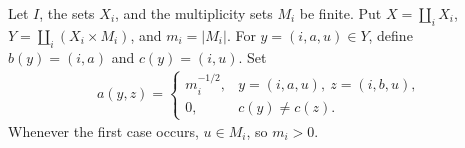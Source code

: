\begin{definition}%
    \label{def:peps_parent_support_copy_amplitude}
    \leanok
    Let $I$, the sets $X_i$, and the multiplicity sets $M_i$ be finite.
    Put $X=\coprod_iX_i$, $Y=\coprod_i(X_i\times M_i)$, and
    $m_i=|M_i|$. For $y=(i,a,u)\in Y$, define
    $b(y)=(i,a)$ and $c(y)=(i,u)$. Set
    \begin{align}
        a(y,z)=
        \begin{cases}
            m_i^{-1/2}, & y=(i,a,u),\ z=(i,b,u), \\
            0,          & c(y)\ne c(z).
        \end{cases}
        \label{eq:peps_parent_support_copy_amplitude}
    \end{align}
    Whenever the first case occurs, $u\in M_i$, so $m_i>0$.
\end{definition}

